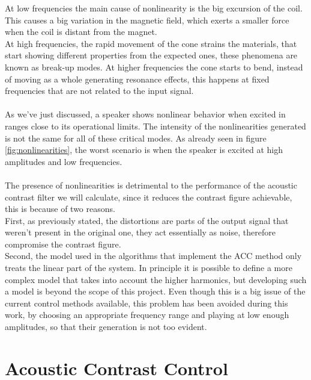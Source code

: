At low frequencies the main cause of nonlinearity is the big excursion of the coil. This causes a big variation in the magnetic field, which exerts a smaller force when the coil is distant from the magnet.
\\
At high frequencies, the rapid movement of the cone strains the materials, that start showing different properties from the expected ones, these phenomena are known as break-up modes. At higher frequencies the cone starts to bend, instead of moving as a whole generating resonance effects, this happens at fixed frequencies that are not related to the input signal.
\\
\\
As we've just discussed, a speaker shows nonlinear behavior when excited in ranges close to its operational limits. The intensity of the nonlinearities generated is not the same for all of these critical modes. As already seen in figure \ref{fig:nonlinearities}, the worst scenario is when the speaker is excited at high amplitudes and low frequencies.
\\
\\
The presence of nonlinearities is detrimental to the performance of the acoustic contrast filter we will calculate, since it reduces the contrast figure achievable, this is because of two reasons.
\\
First, as previously stated, the distortions are parts of the output signal that weren't present in the original one, they act essentially as noise, therefore compromise the contrast figure.
\\
Second, the model used in the algorithms that implement the ACC method only treats the linear part of the system. In principle it is possible to define a more complex model that takes into account the higher harmonics, but developing such a model is beyond the scope of this project. Even though this is a big issue of the current control methods available, this problem has been avoided during this work, by choosing an appropriate frequency range and playing at low enough amplitudes, so that their generation is not too evident.

\section{Acoustic Contrast Control}
\label{sec:acc}

